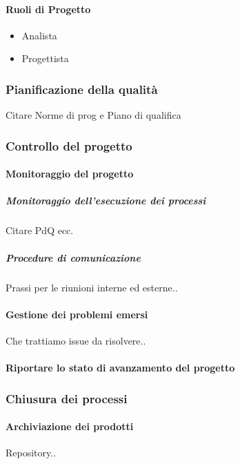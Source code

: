 			\paragraph{Ruoli di Progetto} 
			\begin{itemize}
				\item Analista
				\item Progettista
				
			\end{itemize}
		
		\subsubsection{Pianificazione della qualità}
		Citare Norme di prog e Piano di qualifica
		
		\subsubsection{Controllo del progetto}
		
			\paragraph{Monitoraggio del progetto}
			
			\subparagraph{Monitoraggio dell'esecuzione dei processi}
			Citare PdQ ecc.
			
			\subparagraph{Procedure di comunicazione}
    		Prassi per le riunioni interne ed esterne..
    		
    		
    		\paragraph{Gestione dei problemi emersi}
    		Che trattiamo issue da risolvere..
    		
    		\paragraph{Riportare lo stato di avanzamento del progetto}
    		
    	\subsubsection{Chiusura dei processi}	
    	
    		\paragraph{Archiviazione dei prodotti}
    		Repository..
    		
